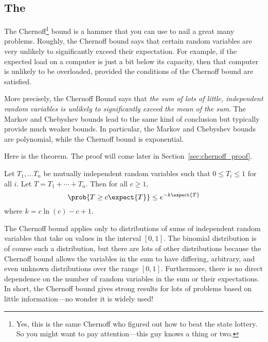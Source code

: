 \subsection{The }

The Chernoff\footnote{Yes, this is the same Chernoff who figured out
  how to beat the state lottery.  So you might want to pay
  attention---this guy knows a thing or two.} bound is a hammer that
you can use to nail a great many problems.  Roughly, the Chernoff
bound says that certain random variables are very unlikely to
significantly exceed their expectation.  For example, if the expected
load on a computer is just a bit below its capacity, then that
computer is unlikely to be overloaded, provided the conditions of the
Chernoff bound are satisfied.

More precisely, the Chernoff Bound says that \emph{the sum of lots of
  little, independent random variables is unlikely to significantly
  exceed the mean of the sum}.  The Markov and Chebyshev bounds lead
to the same kind of conclusion but typically provide much weaker
bounds.  In particular, the Markov and Chebyshev bounds are
polynomial, while the Chernoff bound is exponential.

Here is the theorem.  The proof will come later in
Section~\ref{sec:chernoff_proof}.

\begin{theorem}
\label{chernoff}
Let $T_1, \dots T_n$ be mutually independent random variables such
that $0 \leq T_i \leq 1$ for all $i$.  Let $T = T_1 + \cdots + T_n$.
Then for all $c \geq 1$,
\begin{equation}\label{chernoff-leq}
\prob{T \geq c \expect{T}} \leq e^{-k \expect{T}}
\end{equation}
where $k = c \ln(c) - c + 1$.
\end{theorem}

The Chernoff bound applies only to distributions of sums of
independent random variables that take on values in the interval $[0,
  1]$.  The binomial distribution is of course such a distribution,
but there are lots of other distributions because the Chernoff bound
allows the variables in the sum to have differing, arbitrary, and even
unknown distributions over the range $[0, 1]$.  Furthermore, there is
no direct dependence on the number of random variables in the sum or
their expectations.  In short, the Chernoff bound gives strong results
for lots of problems based on little information---no wonder it is
widely used!

